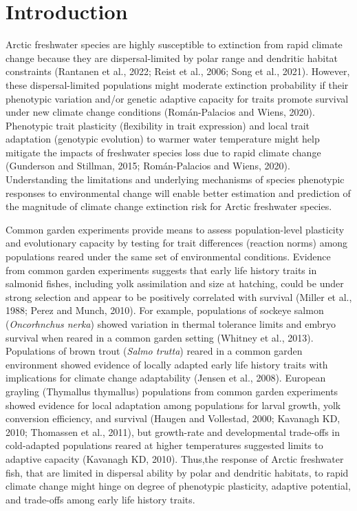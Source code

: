 \documentclass[utf8]{frontiersSCNS}
\begin{document}
\hypertarget{introduction}{%
\section*{Introduction}\label{introduction}}

Arctic freshwater species are highly susceptible to extinction from
rapid climate change because they are dispersal-limited by polar range
and dendritic habitat constraints (Rantanen et al., 2022; Reist et al.,
2006; Song et al., 2021). However, these dispersal-limited populations
might moderate extinction probability if their phenotypic variation
and/or genetic adaptive capacity for traits promote survival under new
climate change conditions (Román-Palacios and Wiens, 2020). Phenotypic
trait plasticity (flexibility in trait expression) and local trait
adaptation (genotypic evolution) to warmer water temperature might help
mitigate the impacts of freshwater species loss due to rapid climate
change (Gunderson and Stillman, 2015; Román-Palacios and Wiens, 2020).
Understanding the limitations and underlying mechanisms of species
phenotypic responses to environmental change will enable better
estimation and prediction of the magnitude of climate change extinction
risk for Arctic freshwater species.

Common garden experiments provide means to assess population-level
plasticity and evolutionary capacity by testing for trait differences
(reaction norms) among populations reared under the same set of
environmental conditions. Evidence from common garden experiments
suggests that early life history traits in salmonid fishes, including
yolk assimilation and size at hatching, could be under strong selection
and appear to be positively correlated with survival (Miller et al.,
1988; Perez and Munch, 2010). For example, populations of sockeye salmon
(\textit{Oncorhnchus nerka}) showed variation in thermal tolerance
limits and embryo survival when reared in a common garden setting
(Whitney et al., 2013). Populations of brown trout
(\textit{Salmo trutta}) reared in a common garden environment showed
evidence of locally adapted early life history traits with implications
for climate change adaptability (Jensen et al., 2008). European grayling
(Thymallus thymallus) populations from common garden experiments showed
evidence for local adaptation among populations for larval growth, yolk
conversion efficiency, and survival (Haugen and Vollestad, 2000;
Kavanagh KD, 2010; Thomassen et al., 2011), but growth-rate and
developmental trade-offs in cold-adapted populations reared at higher
temperatures suggested limits to adaptive capacity (Kavanagh KD, 2010).
Thus,the response of Arctic freshwater fish, that are limited in
dispersal ability by polar and dendritic habitats, to rapid climate
change might hinge on degree of phenotypic plasticity, adaptive
potential, and trade-offs among early life history traits.
\end{document}
